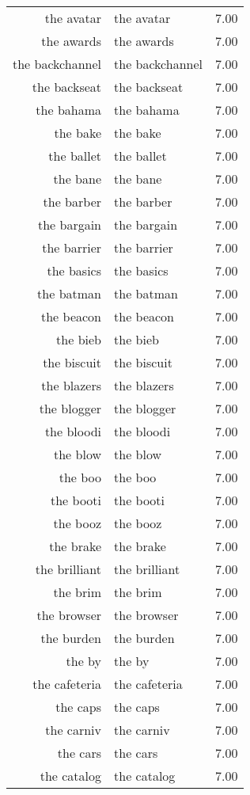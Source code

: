 \begin{table}[ht]
\begin{tabular}{rlr}
  the avatar & the avatar & 7.00 \\ 
  the awards & the awards & 7.00 \\ 
  the backchannel & the backchannel & 7.00 \\ 
  the backseat & the backseat & 7.00 \\ 
  the bahama & the bahama & 7.00 \\ 
  the bake & the bake & 7.00 \\ 
  the ballet & the ballet & 7.00 \\ 
  the bane & the bane & 7.00 \\ 
  the barber & the barber & 7.00 \\ 
  the bargain & the bargain & 7.00 \\ 
  the barrier & the barrier & 7.00 \\ 
  the basics & the basics & 7.00 \\ 
  the batman & the batman & 7.00 \\ 
  the beacon & the beacon & 7.00 \\ 
  the bieb & the bieb & 7.00 \\ 
  the biscuit & the biscuit & 7.00 \\ 
  the blazers & the blazers & 7.00 \\ 
  the blogger & the blogger & 7.00 \\ 
  the bloodi & the bloodi & 7.00 \\ 
  the blow & the blow & 7.00 \\ 
  the boo & the boo & 7.00 \\ 
  the booti & the booti & 7.00 \\ 
  the booz & the booz & 7.00 \\ 
  the brake & the brake & 7.00 \\ 
  the brilliant & the brilliant & 7.00 \\ 
  the brim & the brim & 7.00 \\ 
  the browser & the browser & 7.00 \\ 
  the burden & the burden & 7.00 \\ 
  the by & the by & 7.00 \\ 
  the cafeteria & the cafeteria & 7.00 \\ 
  the caps & the caps & 7.00 \\ 
  the carniv & the carniv & 7.00 \\ 
  the cars & the cars & 7.00 \\ 
  the catalog & the catalog & 7.00 \\ 

\end{tabular}
\end{table}
